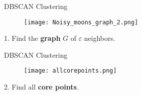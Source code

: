 \documentclass[aspectratio=169]{beamer}
\renewcommand{\epsilon}{\varepsilon}
\begin{document}
\begin{comment}
    \begin{frame}{DBSCAN Clustering}

   DBSCAN clusters are based on the connected components of graph $G$ made of \textbf{core points}.

    \vspace{0.5cm}

    \begin{figure}
        \centering
        \texttt{[image: corepointsconnectedcomp.png]}
        \label{fig:enter-label}
    \end{figure}
    
\end{frame}

\begin{frame}{DBSCAN Clustering}
    Clusters should also contain \textbf{border points} adjacent to their core points.
    \vspace{0.5cm}
    \begin{figure}
        \centering
        \texttt{[image: dbscan\_add\_border\_points.png]}
    \end{figure}
    
\end{frame}
\end{comment}

\begin{frame}{DBSCAN Clustering}
    \begin{minipage}[c]{0.55\textwidth}
        \begin{figure}
            \centering
            \texttt{[image: Noisy\_moons\_graph\_2.png]}
        \end{figure}
    \end{minipage}
    \hfill
    \begin{minipage}[c]{0.44\textwidth}
        1. Find the \textbf{graph} $G$ of $\epsilon$ neighbors.
    \end{minipage}
\end{frame}

\begin{frame}{DBSCAN Clustering}
    \begin{minipage}[c]{0.55\textwidth}
        \begin{figure}
            \centering
            \texttt{[image: allcorepoints.png]}
        \end{figure}
    \end{minipage}
    \hfill
    \begin{minipage}[c]{0.44\textwidth}
        2. Find all \textbf{core points}.
    \end{minipage}
\end{frame}
\end{document}
